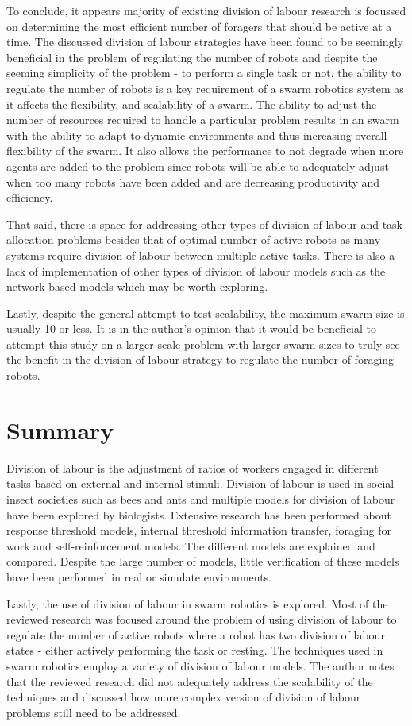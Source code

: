 To conclude, it appears majority of existing division of labour research is focussed on determining the most efficient number of foragers that should be active at a time. The discussed division of labour strategies have been found to be seemingly beneficial in the problem of regulating the number of robots and despite the seeming simplicity of the problem - to perform a single task or not, the ability to regulate the number of robots is a key requirement of a swarm robotics system as it affects the flexibility, and scalability of a swarm. The ability to adjust the number of resources required to handle a particular problem results in an swarm with the ability to adapt to dynamic environments and thus increasing overall flexibility of the swarm. It also allows the performance to not degrade when more agents are added to the problem since robots will be able to adequately adjust when too many robots have been added and are decreasing productivity and efficiency. 

That said, there is space for addressing other types of division of labour and task allocation problems besides that of optimal number of active robots as many systems require division of labour between multiple active tasks. There is also a lack of implementation of other types of division of labour models such as the network based models which may be worth exploring.

Lastly, despite the general attempt to test scalability, the maximum swarm size is usually 10 or less. It is in the author's opinion that it would be beneficial to attempt this study on a larger scale problem with larger swarm sizes to truly see the benefit in the division of labour strategy to regulate the number of foraging robots. 

\section{Summary}
\label{sec:second:summary}
Division of labour is the adjustment of ratios of workers engaged in different tasks based on external and internal stimuli. Division of labour is used in social insect societies such as bees and ants and multiple models for division of labour have been explored by biologists. Extensive research has been performed about response threshold models, internal threshold information transfer, foraging for work and self-reinforcement models. The different models are explained and compared. Despite the large number of models, little verification of these models have been performed in real or simulate environments. 

Lastly, the use of division of labour in swarm robotics is explored. Most of the reviewed research was focused around the problem of using division of labour to regulate the number of active robots where a robot has two division of labour states - either actively performing the task or resting. The techniques used in swarm robotics employ a variety of division of labour models. The author notes that the reviewed research did not adequately address the scalability of the techniques and discussed how more complex version of division of labour problems still need to be addressed.